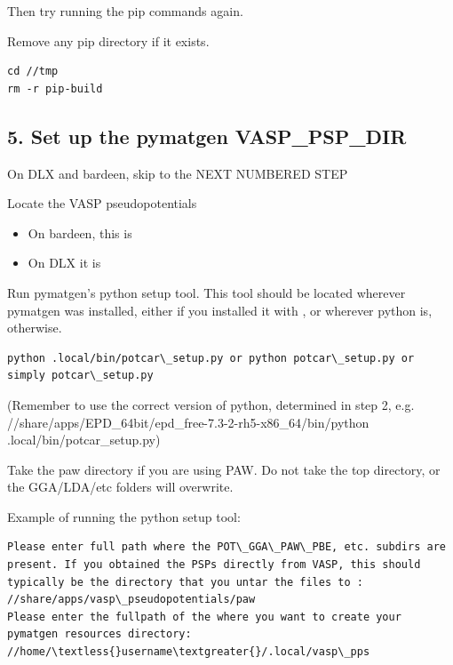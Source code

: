 \documentclass[letterpaper,10pt,english]{sphinxmanual}
\begin{document}
Then try running the pip commands again.

Remove any pip directory if it exists.

\begin{Verbatim}[commandchars=\\\{\}]
cd //tmp
rm -r pip-build
\end{Verbatim}


\subsection{5. Set up the pymatgen VASP\_PSP\_DIR}
\label{1_0_installation:set-up-the-pymatgen-vasp-psp-dir}
On DLX and bardeen, skip to the NEXT NUMBERED STEP

Locate the VASP pseudopotentials
\begin{itemize}
\item {} 
On bardeen, this is 

\item {} 
On DLX it is 

\end{itemize}

Run pymatgen's python setup tool. This tool should be located wherever pymatgen was installed, either  if you installed it with , or wherever python is, otherwise.

\begin{Verbatim}[commandchars=\\\{\}]
python .local/bin/potcar\_setup.py or python potcar\_setup.py or simply potcar\_setup.py
\end{Verbatim}

(Remember to use the correct version of python, determined in step 2, e.g. //share/apps/EPD\_64bit/epd\_free-7.3-2-rh5-x86\_64/bin/python .local/bin/potcar\_setup.py)

Take the paw directory if you are using PAW. Do not take the top directory, or the GGA/LDA/etc folders will overwrite.

Example of running the python setup tool:

\begin{Verbatim}[commandchars=\\\{\}]
Please enter full path where the POT\_GGA\_PAW\_PBE, etc. subdirs are present. If you obtained the PSPs directly from VASP, this should typically be the directory that you untar the files to : //share/apps/vasp\_pseudopotentials/paw
Please enter the fullpath of the where you want to create your pymatgen resources directory:
//home/\textless{}username\textgreater{}/.local/vasp\_pps
\end{Verbatim}
\end{document}

